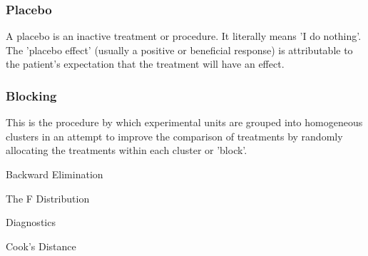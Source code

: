 \subsubsection*{Placebo} 
A placebo is an inactive treatment or procedure. It literally means 'I do nothing'. The 'placebo effect' (usually a positive or beneficial response) is attributable to the patient's expectation that the treatment will have an effect.
\subsubsection*{Blocking}
This is the procedure by which experimental units are grouped into homogeneous clusters in an attempt to improve the comparison of treatments by randomly allocating the treatments within each cluster or 'block'.

\item	Backward Elimination
\item	The F Distribution
\item 	Diagnostics
\item	Cook’s Distance

